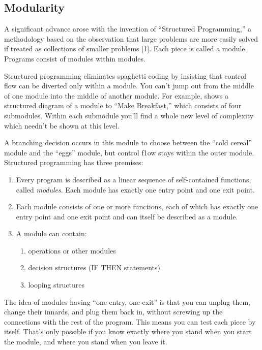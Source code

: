 \subsection{Modularity}

A significant advance arose with the invention of {}``Structured
Programming,'' a methodology based on the observation that large problems
are more easily solved if treated as collections of smaller problems
{[}1{]}. Each piece is called a module. Programs consist of modules
within modules.




Structured programming eliminates spaghetti coding by insisting that
control flow can be diverted only within a module. You can't jump
out from the middle of one module into the middle of another module.
For example,  shows a structured diagram of a module to
{}``Make Breakfast,'' which consists of four submodules. Within each
submodule you'll find a whole new level of complexity which needn't
be shown at this level.

A branching decision occurs in this module to choose between the
{}``cold cereal'' module and the {}``eggs'' module, but control f1ow stays
within the outer module. Structured programming has three premises:

\begin{enumerate}
\item Every program is described as a linear sequence of self-contained
functions, called \emph{modules}. Each module has exactly one entry
point and one exit point.
\item Each module consists of one or more functions, each of which has exactly
one entry point and one exit point and can itself be described as
a module.
\item A module can contain:

\begin{enumerate}
\item operations or other modules
\item decision structures (IF THEN statements)
\item looping structures
\end{enumerate}
\end{enumerate}
The idea of modules having {}``one-entry, one-exit'' is that you
can unplug them, change their innards, and plug them back in, without
screwing up the connections with the rest of the program. This means
you can test each piece by itself. That's only possible if you know
exactly where you stand when you start the module, and where you stand
when you leave it.

